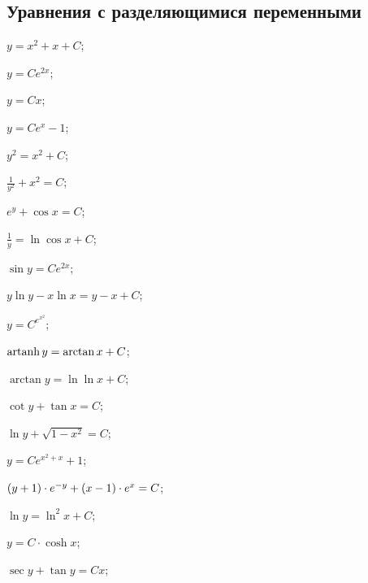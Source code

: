 \subsection*{Уравнения с разделяющимися переменными}

	\label{sol:firstorder:separable}
	\begin{enumsols}
		
		\item \( y = x^2 + x + C \); \sfill %
		\item \( y = C e^{2x} \); \sfill %
		\item \( y = Cx \); \sfill %
		\item \( y = Ce^{x} - 1  \); \sfill %
		\item \( y^2 = x^2 + C \); \sfill %
		\item \( \frac{1}{y^2} + x^2 = C \); \sfill %
		\item \( e^y + \cos{x} = C \); \sfill %
		\item \( \frac{1}{y} = \ln{\cos{x}} + C \); \sfill %
		\item \( \sin{y} = Ce^{2x} \); \sfill %
		\item \( y \ln{y} - x \ln{x} = y - x + C \); \sfill %
		\item \( y = C^{e^{x^2}} \); \sfill %
		\item \( \operatorname{artanh}{y} = \arctan{x} + C \); \sfill %
		\item \( \arctan{y} = \ln{\ln{x}} + C \); \sfill %
		\item \( \cot{y} + \tan{x} = C \); \sfill %
		\item \( \ln{y} + \sqrt{1 - x^2} = C \); \sfill %
		\item \( y = Ce^{x^2 + x} + 1 \); \sfill %
		\item \( \left( y + 1 \right) \cdot e^{-y} + \left( x - 1 \right) \cdot e^{x} = C \); \sfill %
		\item \( \ln{y} = \ln^2{x} + C \); \sfill %
		\item \( y = C \cdot \cosh{x} \); \sfill %
		\item \( \sec{y} + \tan{y} = Cx \); \sfill %

\end{enumsols}
